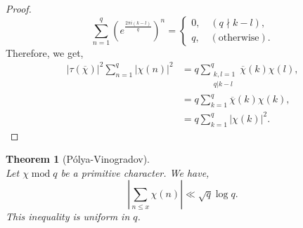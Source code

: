 \documentclass{article}
\newtheorem{theorem}{Theorem} [section]
\DeclareMathOperator{\tmod}{mod}
\begin{document}
\begin{proof}
  \begin{equation*}
    \sum_{n=1}^q\left(e^{{\frac {2\pi i(k-l)} q}}\right)^n = \begin{cases}
      0,\quad(q\nmid k-l),\\
      q,\quad(\text{otherwise}).
    \end{cases}
  \end{equation*}
  Therefore, we get,
  \begin{align*}
    \vert\tau (\overline{\chi})\vert^2\sum_{n=1}^q\vert\chi(n)\vert^2 & = q\sum_{\substack{k,l=1\\ q|k-l}}^q \overline{\chi}(k)\chi(l),\\
    & = q\sum_{k=1}^q\overline{\chi}(k)\chi(k),\\
    & = q\sum_{k=1}^q \vert \chi(k)\vert^2.
  \end{align*} 
\end{proof}
\begin{theorem}[Pólya-Vinogradov]$\:$\\
  Let $\chi\tmod q$ be a primitive character. We have,
  \begin{equation*}
    \left\vert\sum_{n\leq x}\chi(n)\right\vert\ll \sqrt{q}\log q.
  \end{equation*}
  This inequality is uniform in $q$.
\end{theorem}
\end{document}
